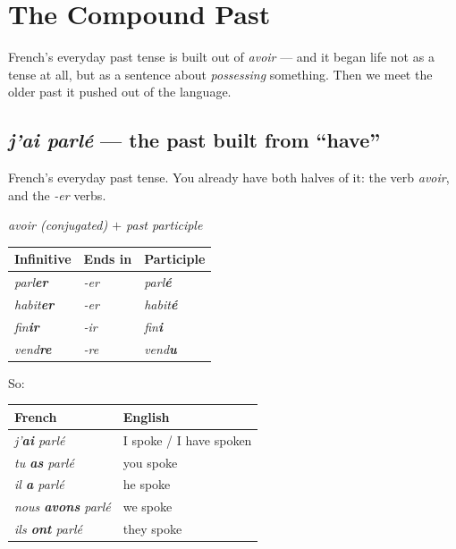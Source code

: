 \chapter{The Compound Past}
\label{ch:passe-compose}

French's everyday past tense is built out of \emph{avoir} --- and it began life
not as a tense at all, but as a sentence about \emph{possessing} something. Then
we meet the older past it pushed out of the language.

\section{\emph{j'ai parl\'{e}} --- the past built from ``have''}
\label{lesson:passe-compose}

French's everyday past tense. You already have both halves of it: the verb
\emph{avoir}, and the \emph{-er} verbs.

\begin{center}\itshape
avoir (conjugated) $+$ past participle
\end{center}

\begin{center}
\begin{tabular}{@{}lll@{}}
\toprule
Infinitive & Ends in & Participle \\
\midrule
\emph{parl\textbf{er}} & \emph{-er} & \emph{parl\textbf{\'{e}}} \\
\emph{habit\textbf{er}} & \emph{-er} & \emph{habit\textbf{\'{e}}} \\
\emph{fin\textbf{ir}} & \emph{-ir} & \emph{fin\textbf{i}} \\
\emph{vend\textbf{re}} & \emph{-re} & \emph{vend\textbf{u}} \\
\bottomrule
\end{tabular}
\end{center}

So:

\begin{center}
\begin{tabular}{@{}ll@{}}
\toprule
French & English \\
\midrule
\emph{j'\textbf{ai} parl\'{e}} & I spoke / I have spoken \\
\emph{tu \textbf{as} parl\'{e}} & you spoke \\
\emph{il \textbf{a} parl\'{e}} & he spoke \\
\emph{nous \textbf{avons} parl\'{e}} & we spoke \\
\emph{ils \textbf{ont} parl\'{e}} & they spoke \\
\bottomrule
\end{tabular}
\end{center}

